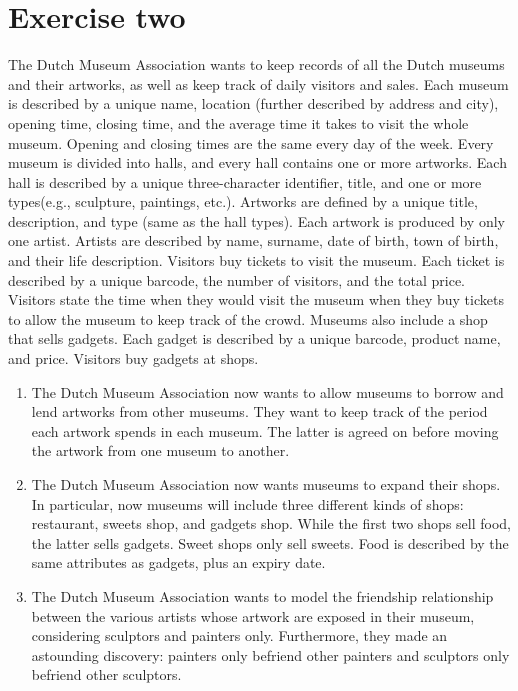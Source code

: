 \section{Exercise two}

The Dutch Museum Association wants to keep records of all the Dutch museums and their artworks, as well as keep track of daily visitors and sales.
Each museum is described by a unique name, location (further described by address and city), opening time, closing time, and the average time it takes to visit the whole museum. Opening and closing times are the same every day of the week. 
Every museum is divided into halls, and every hall contains one or more artworks. 
Each hall is described by a unique three-character identifier, title, and one or more types(e.g., sculpture, paintings, etc.). 
Artworks are defined by a unique title, description, and type (same as the hall types). 
Each artwork is produced by only one artist. 
Artists are described by name, surname, date of birth, town of birth, and their life description. 
Visitors buy tickets to visit the museum. 
Each ticket is described by a unique barcode, the number of visitors, and the total price. 
Visitors state the time when they would visit the museum when they buy tickets to allow the museum to keep track of the crowd. 
Museums also include a shop that sells gadgets. 
Each gadget is described by a unique barcode, product name, and price. Visitors buy gadgets at shops.
\begin{enumerate}
    \item The Dutch Museum Association now wants to allow museums to borrow and lend artworks from other museums. 
        They want to keep track of the period each artwork spends in each museum. 
        The latter is agreed on before moving the artwork from one museum to another.
    \item The Dutch Museum Association now wants museums to expand their shops. 
        In particular, now museums will include three different kinds of shops: restaurant, sweets shop, and gadgets shop.
        While the first two shops sell food, the latter sells gadgets.
        Sweet shops only sell sweets. 
        Food is described by the same attributes as gadgets, plus an expiry date.
    \item The Dutch Museum Association wants to model the friendship relationship between the various artists whose artwork are exposed in their museum, considering sculptors and painters only. 
    Furthermore, they made an astounding discovery: painters only befriend other painters and sculptors only befriend other sculptors.
\end{enumerate}
